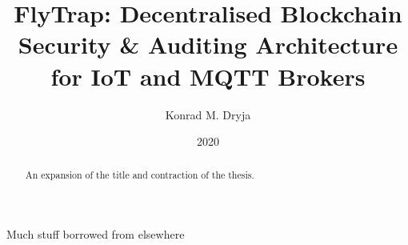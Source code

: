 \documentclass[msci]{abdnthesis}
\title{FlyTrap: Decentralised Blockchain Security \& Auditing Architecture for IoT and MQTT Brokers}
\author{Konrad M. Dryja}
\date{2020}
\begin{document}

\maketitle
\makedeclaration


\begin{abstract}
  An expansion of the title and contraction of the thesis.
\end{abstract}

\begin{acknowledgements}
  Much stuff borrowed from elsewhere
\end{acknowledgements}



\tableofcontents

\printnoidxglossary[type=\acronymtype,title=Abbreviations,nonumberlist]








% 

\appendix




\end{document}
